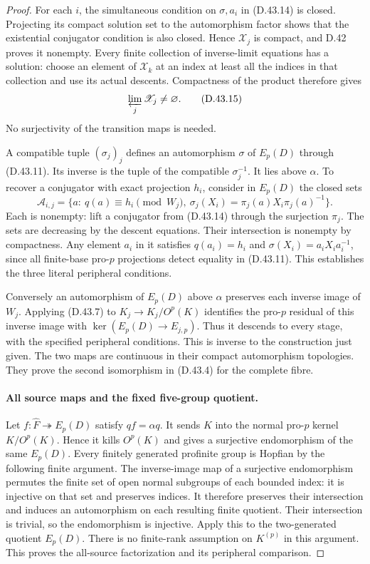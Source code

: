 \begin{proof}
For each \(i\), the simultaneous
condition on \(\sigma,a_i\) in
\textup{(D.43.14)} is closed.
Projecting its compact solution
set to the automorphism factor
shows that the existential
conjugator condition is also
closed.
Hence \(\mathscr X_j\) is
compact, and D.42 proves it
nonempty.
Every finite collection of
inverse-limit equations has
a solution: choose an element
of \(\mathscr X_k\) at an
index at least all the indices
in that collection and use
its actual descents.
Compactness of the product
therefore gives
\[
                         \varprojlim_j\mathscr X_j
                                  \ne\varnothing .
 \tag{D.43.15}
\]
No surjectivity of the
transition maps is needed.

A compatible tuple
\((\sigma_j)_j\) defines an
automorphism \(\sigma\) of
\(E_p(D)\) through
\textup{(D.43.11)}.
Its inverse is the tuple of
the compatible \(\sigma_j^{-1}\).
It lies above \(\alpha\).
To recover a conjugator with
exact projection \(h_i\),
consider in \(E_p(D)\) the
closed sets
\[
 \mathcal A_{i,j}=
 \{a:\ q(a)\equiv h_i\pmod {W_j},\
      \sigma_j(X_i)=\pi_j(a)X_i\pi_j(a)^{-1}\}.
 \tag{D.43.16}
\]
Each is nonempty: lift a
conjugator from
\textup{(D.43.14)} through
the surjection \(\pi_j\).
The sets are decreasing
by the descent equations.
Their intersection is
nonempty by compactness.
Any element \(a_i\) in it
satisfies \(q(a_i)=h_i\)
and
\(\sigma(X_i)=a_iX_i a_i^{-1}\),
since all finite-base
pro-\(p\) projections detect
equality in
\textup{(D.43.11)}.
This establishes the three
literal peripheral conditions.

Conversely an automorphism
of \(E_p(D)\) above \(\alpha\)
preserves each inverse image
of \(W_j\).
Applying
\textup{(D.43.7)} to
\(K_j\to K_j/O^p(K)\)
identifies the pro-\(p\)
residual of this inverse
image with
\(\ker(E_p(D)\to E_{j,p})\).
Thus it descends to every
stage, with the specified
peripheral conditions.
This is inverse to the
construction just given.
The two maps are continuous
in their compact
automorphism topologies.
They prove the second
isomorphism in
\textup{(D.43.4)} for the
complete fibre.

\paragraph{All source maps and the fixed five-group quotient.}
Let \(f:\widehat F\twoheadrightarrow E_p(D)\)
satisfy \(q f=\alpha q\).
It sends \(K\) into the
normal pro-\(p\) kernel
\(K/O^p(K)\).
Hence it kills \(O^p(K)\)
and gives a surjective
endomorphism of the same
\(E_p(D)\).
Every finitely generated
profinite group is Hopfian
by the following finite
argument.
The inverse-image map of
a surjective endomorphism
permutes the finite set of
open normal subgroups of
each bounded index:
it is injective on that
set and preserves indices.
It therefore preserves
their intersection and
induces an automorphism
on each resulting finite
quotient.
Their intersection is
trivial, so the endomorphism
is injective.
Apply this to the
two-generated quotient
\(E_p(D)\).
There is no finite-rank
assumption on \(K^{(p)}\)
in this argument.
This proves the
all-source factorization
and its peripheral
comparison.


\end{proof}
